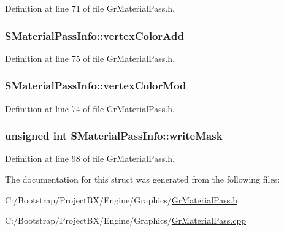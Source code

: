Definition at line 71 of file GrMaterialPass.h.\hypertarget{struct_s_material_pass_info_8d6e08ed3afd1c51ea0320bd485dadf5}{
\subsubsection[{vertexColorAdd}]{ {\bf SMaterialPassInfo::vertexColorAdd}}}
\label{struct_s_material_pass_info_8d6e08ed3afd1c51ea0320bd485dadf5}




Definition at line 75 of file GrMaterialPass.h.\hypertarget{struct_s_material_pass_info_a129865ee753ac3056cd69490330f782}{
\subsubsection[{vertexColorMod}]{ {\bf SMaterialPassInfo::vertexColorMod}}}
\label{struct_s_material_pass_info_a129865ee753ac3056cd69490330f782}




Definition at line 74 of file GrMaterialPass.h.\hypertarget{struct_s_material_pass_info_06ba69d3100e1ce0a27d8da74c1f342d}{
\subsubsection[{writeMask}]{\setlength{\rightskip}{0pt plus 5cm}unsigned int {\bf SMaterialPassInfo::writeMask}}}
\label{struct_s_material_pass_info_06ba69d3100e1ce0a27d8da74c1f342d}




Definition at line 98 of file GrMaterialPass.h.

The documentation for this struct was generated from the following files:\begin{CompactItemize}
\item 
C:/Bootstrap/ProjectBX/Engine/Graphics/\hyperlink{_gr_material_pass_8h}{GrMaterialPass.h}\item 
C:/Bootstrap/ProjectBX/Engine/Graphics/\hyperlink{_gr_material_pass_8cpp}{GrMaterialPass.cpp}\end{CompactItemize}
